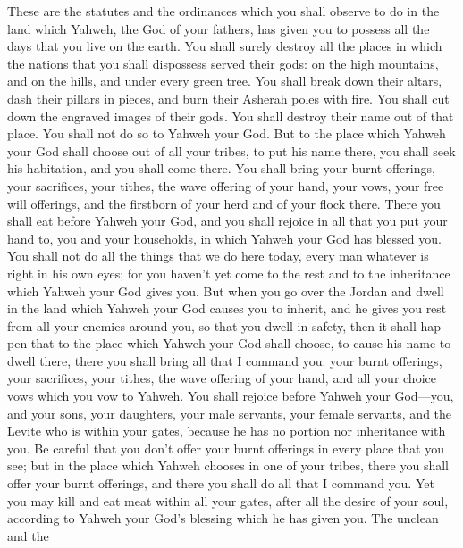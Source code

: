 \begin{paracol}{2}
\begin{otherlanguage}{english}
 These are the statutes and the ordinances which you shall
observe to do in the land which Yahweh, the God of your fathers, has
given you to possess all the days that you live on the earth.
 You shall surely destroy all the places in which the
nations that you shall dispossess served their gods: on the high
mountains, and on the hills, and under every green tree. 
You shall break down their altars, dash their pillars in pieces, and
burn their Asherah poles with fire. You shall cut down the engraved
images of their gods. You shall destroy their name out of that place.
 You shall not do so to Yahweh your God. 
But to the place which Yahweh your God shall choose out of all your
tribes, to put his name there, you shall seek his habitation, and you
shall come there.  You shall bring your burnt offerings,
your sacrifices, your tithes, the wave offering of your hand, your vows,
your free will offerings, and the firstborn of your herd and of your
flock there.  There you shall eat before Yahweh your God,
and you shall rejoice in all that you put your hand to, you and your
households, in which Yahweh your God has blessed you.  You
shall not do all the things that we do here today, every man whatever is
right in his own eyes;  for you haven't yet come to the
rest and to the inheritance which Yahweh your God gives you.
 But when you go over the Jordan and dwell in the land
which Yahweh your God causes you to inherit, and he gives you rest from
all your enemies around you, so that you dwell in safety,
 then it shall happen that to the place which Yahweh your
God shall choose, to cause his name to dwell there, there you shall
bring all that I command you: your burnt offerings, your sacrifices,
your tithes, the wave offering of your hand, and all your choice vows
which you vow to Yahweh.  You shall rejoice before Yahweh
your God---you, and your sons, your daughters, your male servants, your
female servants, and the Levite who is within your gates, because he has
no portion nor inheritance with you.  Be careful that you
don't offer your burnt offerings in every place that you see;
 but in the place which Yahweh chooses in one of your
tribes, there you shall offer your burnt offerings, and there you shall
do all that I command you.  Yet you may kill and eat meat
within all your gates, after all the desire of your soul, according to
Yahweh your God's blessing which he has given you. The unclean and the

\end{otherlanguage}
\end{paracol}
